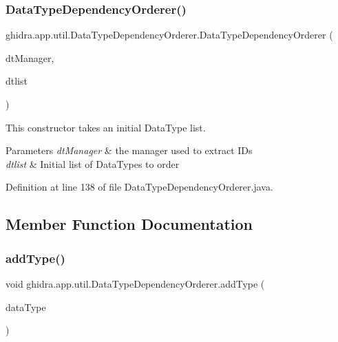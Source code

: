 \subsubsection{\texorpdfstring{DataTypeDependencyOrderer()}{DataTypeDependencyOrderer()}\hspace{0.1cm}{\footnotesize\ttfamily [2/2]}}
{\footnotesize\ttfamily ghidra.\+app.\+util.\+Data\+Type\+Dependency\+Orderer.\+Data\+Type\+Dependency\+Orderer (\begin{DoxyParamCaption}\item[{Data\+Type\+Manager}]{dt\+Manager,  }\item[{Array\+List$<$ Data\+Type $>$}]{dtlist }\end{DoxyParamCaption})\hspace{0.3cm}{\ttfamily [inline]}}

This constructor takes an initial Data\+Type list. 
\begin{DoxyParams}{Parameters}
{\em dt\+Manager} & the manager used to extract I\+Ds \\
\hline
{\em dtlist} & Initial list of Data\+Types to order \\
\hline
\end{DoxyParams}


Definition at line 138 of file Data\+Type\+Dependency\+Orderer.\+java.



\subsection{Member Function Documentation}
\mbox{\label{classghidra_1_1app_1_1util_1_1_data_type_dependency_orderer_ac1f0b4ed6ad0e2ad67bc755e210cf77a}} 
\subsubsection{\texorpdfstring{addType()}{addType()}}
{\footnotesize\ttfamily void ghidra.\+app.\+util.\+Data\+Type\+Dependency\+Orderer.\+add\+Type (\begin{DoxyParamCaption}\item[{Data\+Type}]{data\+Type }\end{DoxyParamCaption})\hspace{0.3cm}{\ttfamily [inline]}}

